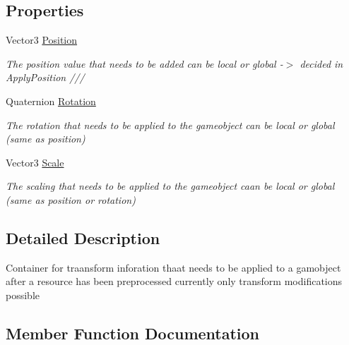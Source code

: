 \subsection*{Properties}
\begin{DoxyCompactItemize}
\item 
Vector3 \mbox{\hyperlink{class_pre_processing_game_object_information_ae7d763dae363a10176299f0dda2347fb}{Position}}
\begin{DoxyCompactList}\small\item\em The position value that needs to be added can be local or global -\/$>$ decided in Apply\+Position /// \end{DoxyCompactList}\item 
Quaternion \mbox{\hyperlink{class_pre_processing_game_object_information_a6b7430b36e281c146006f54390a9b555}{Rotation}}
\begin{DoxyCompactList}\small\item\em The rotation that needs to be applied to the gameobject can be local or global (same as position) \end{DoxyCompactList}\item 
Vector3 \mbox{\hyperlink{class_pre_processing_game_object_information_a92d86eb1e4dd81055f7b04d3d5aaeb4d}{Scale}}
\begin{DoxyCompactList}\small\item\em The scaling that needs to be applied to the gameobject caan be local or global (same as position or rotation) \end{DoxyCompactList}\end{DoxyCompactItemize}


\subsection{Detailed Description}
Container for traansform inforation thaat needs to be applied to a gamobject after a resource has been preprocessed currently only transform modifications possible 



\subsection{Member Function Documentation}
\mbox{\label{class_pre_processing_game_object_information_af58318fffb0f07751dc2472fe7dce7ef}} 
